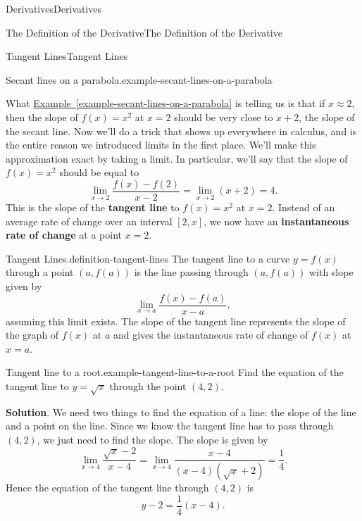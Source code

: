\documentclass[10pt,]{book}
\newcommand{\terminology}[1]{\textbf{#1}}
\numberwithin{equation}{section}
\begin{document}
\begin{chapterptx}{Derivatives}{}{Derivatives}{}{}
\begin{sectionptx}{The Definition of the Derivative}{}{The Definition of the Derivative}{}{}
\begin{subsectionptx}{Tangent Lines}{}{Tangent Lines}{}{}
\begin{example}{Secant lines on a parabola.}{example-secant-lines-on-a-parabola}
%
\end{example}
\hypertarget{p-78}{}%
What \hyperref[example-secant-lines-on-a-parabola]{Example~\ref{example-secant-lines-on-a-parabola}} is telling us is that if \(x\approx2\), then the slope of \(f(x) = x^{2}\) at \(x=2\) should be very close to \(x+2\), the slope of the secant line. Now we'll do a trick that shows up everywhere in calculus, and is the entire reason we introduced limits in the first place. We'll make this approximation exact by taking a limit. In particular, we'll say that the slope of \(f(x) = x^{2}\) should be equal to%
\begin{equation*}
\lim_{x\to2}\frac{f(x)-f(2)}{x-2} = \lim_{x\to2}(x+2) = 4.
\end{equation*}
This is the slope of the \terminology{tangent line} to \(f(x) = x^{2}\) at \(x=2\). Instead of an average rate of change over an interval \([2,x]\), we now have an \terminology{instantaneous rate of change} at a point \(x=2\).%
\begin{definition}{Tangent Lines.}{definition-tangent-lines}%
\hypertarget{p-79}{}%
The tangent line to a curve \(y=f(x)\) through a point \((a,f(a))\) is the line passing through \((a,f(a))\) with slope given by%
\begin{equation*}
\lim_{x\to a}\frac{f(x)-f(a)}{x-a},
\end{equation*}
assuming this limit exists. The slope of the tangent line represents the slope of the graph of \(f(x)\) at \(a\) and gives the instantaneous rate of change of \(f(x)\) at \(x=a\).%
\end{definition}
\begin{example}{Tangent line to a root.}{example-tangent-line-to-a-root}%
\hypertarget{p-80}{}%
Find the equation of the tangent line to \(y=\sqrt{x}\) through the point \((4,2)\).%
\par\smallskip%
\noindent\textbf{Solution}.\hypertarget{solution-17}{}\quad%
\hypertarget{p-81}{}%
We need two things to find the equation of a line: the slope of the line and a point on the line. Since we know the tangent line has to pass through \((4,2)\), we just need to find the slope. The slope is given by%
\begin{equation*}
\lim_{x\to 4}\frac{\sqrt{x}-2}{x-4} = \lim_{x\to4}\frac{x-4}{(x-4)(\sqrt{x}+2)} = \frac{1}{4}.
\end{equation*}
Hence the equation of the tangent line through \((4,2)\) is%
\begin{equation*}
y-2 = \frac{1}{4}(x-4).
\end{equation*}

\end{example}
\end{subsectionptx}
\end{sectionptx}
\end{chapterptx}
\end{document}
